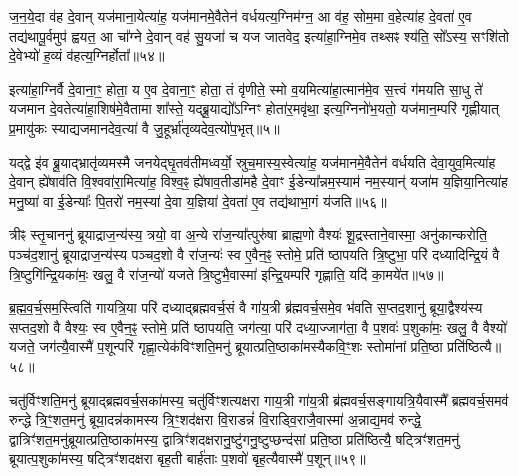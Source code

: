 ज॒न॒ये॒दा व॑ह दे॒वान् यज॑माना॒येत्या॑ह॒ यज॑मानमे॒वैतेन॑ वर्धयत्य॒ग्निम॑ग्न॒ आ व॑ह॒ सोम॒मा व॒हेत्या॑ह दे॒वता॑ ए॒व तद्य॑थापू॒र्वमुप॑ ह्वयत॒ आ चा᳚ग्ने दे॒वान् वह॑ सु॒यजा॑ च यज जातवेद॒ इत्या॑हा॒ग्निमे॒व तथ्सꣴ श्य॑ति॒ सो᳚\-ऽस्य॒ सꣳशि॑तो दे॒वेभ्यो॑ ह॒व्यं व॑हत्य॒ग्निर्\mbox{}होता᳚॥५४॥

इत्या॑हा॒ग्निर्वै दे॒वाना॒ꣳ॒ होता॒ य ए॒व दे॒वाना॒ꣳ॒ होता॒ तं वृ॑णीते॒ स्मो व॒यमित्या॑हा॒त्मान॑मे॒व स॒त्त्वं ग॑मयति सा॒धु ते॑ यजमान दे॒वतेत्या॑हा॒शिष॑मे॒वैतामा शा᳚स्ते॒ यद्ब्रू॒याद्यो᳚\-ऽग्निꣳ होता॑र॒मवृ॑था॒ इत्य॒ग्निनो॑भ॒यतो॒ यज॑मान॒म्परि॑ गृह्णीयात् प्र॒मायु॑कः स्याद्यजमानदेव॒त्या॑ वै जु॒हूर्भ्रा॑तृव्यदेव॒त्यो॑प॒भृत्॥५॥

यद्द्वे इ॑व ब्रू॒याद्भ्रातृ॑व्यमस्मै जनयेद्घृ॒तव॑तीमध्वर्यो॒ स्रुच॒मास्य॒स्वेत्या॑ह॒ यज॑मानमे॒वैतेन॑ वर्धयति देवा॒युव॒मित्या॑ह दे॒वान् ह्ये॑षाव॑ति वि॒श्ववा॑रा॒मित्या॑ह॒ विश्व॒ꣴ॒ ह्ये॑षाव॒तीडा॑महै दे॒वाꣳ ई॒डेन्या᳚न्नम॒स्याम॑ नम॒स्यान्॑ यजा॑म य॒ज्ञिया॒नित्या॑ह मनु॒ष्या॑ वा ई॒डेन्याः᳚ पि॒तरो॑ नम॒स्या॑ दे॒वा य॒ज्ञिया॑ दे॒वता॑ ए॒व तद्य॑थाभा॒गं य॑जति॥५६॥

{\anuvakamend[{विप्रा॑नुमदित॒ इत्या॑ह च॒नास्मै॒ होतो॑प॒भृद्दे॒वता॑ ए॒व त्रीणि॑ च॥९॥}]}

त्रीꣴ स्तृ॒चाननु॑ ब्रूयाद्राज॒न्य॑स्य॒ त्रयो॒ वा अ॒न्ये रा॑ज॒न्या᳚त्पुरु॑षा ब्राह्म॒णो वैश्यः॑ शू॒द्रस्ताने॒वास्मा॒ अनु॑कान्करोति॒ पञ्च॑द॒शानु॑ ब्रूयाद्राज॒न्य॑स्य पञ्चद॒शो वै रा॑ज॒न्यः॑ स्व ए॒वैन॒ꣴ॒ स्तोमे॒ प्रति॑ ष्ठापयति त्रि॒ष्टुभा॒ परि॑ दध्यादिन्द्रि॒यं वै त्रि॒ष्टुगि॑न्द्रि॒यका॑मः॒ खलु॒ वै रा॑ज॒न्यो॑ यजते त्रि॒ष्टुभै॒वास्मा॑ इन्द्रि॒यम्परि॑ गृह्णाति॒ यदि॑ का॒मये॑त॥५७॥

ब्र॒ह्म॒व॒र्च॒सम॒स्त्विति॑ गायत्रि॒या परि॑ दध्याद्ब्रह्मवर्च॒सं वै गा॑य॒त्री ब्र॑ह्मवर्च॒समे॒व भ॑वति स॒प्तद॒शानु॑ ब्रूया॒द्वैश्य॑स्य सप्तद॒शो वै वैश्यः॒ स्व ए॒वैन॒ꣴ॒ स्तोमे॒ प्रति॑ ष्ठापयति॒ जग॑त्या॒ परि॑ दध्या॒ज्जाग॑ता॒ वै प॒शवः॑ प॒शुका॑मः॒ खलु॒ वै वैश्यो॑ यजते॒ जग॑त्यै॒वास्मै॑ प॒शून्परि॑ गृह्णा॒त्येक॑विꣳशति॒मनु॑ ब्रूयात्प्रति॒ष्ठाका॑मस्यैकवि॒ꣳ॒शः स्तोमा॑नां प्रति॒ष्ठा प्रति॑ष्ठित्यै॥५८॥

चतु॑र्विꣳशति॒मनु॑ ब्रूयाद्ब्रह्मवर्च॒सका॑मस्य॒ चतु॑र्विꣳशत्यक्षरा गाय॒त्री गा॑य॒त्री ब्र॑ह्मवर्च॒सङ्गायत्रि॒यैवास्मै᳚ ब्रह्मवर्च॒समव॑ रुन्द्धे त्रि॒ꣳ॒शत॒मनु॑ ब्रूया॒दन्न॑कामस्य त्रि॒ꣳ॒शद॑क्षरा वि॒राडन्नं॑ वि॒राड्वि॒राजै॒वास्मा॑ अ॒न्नाद्य॒मव॑ रुन्द्धे॒ द्वात्रिꣳ॑शत॒मनु॑ब्रूयात्प्रति॒ष्ठाका॑मस्य॒ द्वात्रिꣳ॑शदक्षरानु॒ष्टु॑गनु॒ष्टुप्छन्द॑सां प्रति॒ष्ठा प्रति॑ष्ठित्यै॒ षट्त्रिꣳ॑शत॒मनु॑ ब्रूयात्प॒शुका॑मस्य॒ षट्त्रिꣳ॑शदक्षरा बृह॒ती बार्\mbox{}ह॑ताः प॒शवो॑ बृह॒त्यैवास्मै॑ प॒शून्॥५९॥

